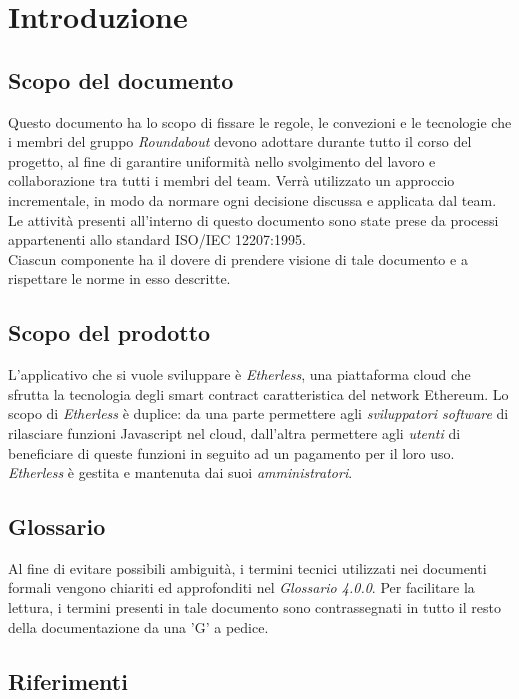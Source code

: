 \section{Introduzione}

\subsection{Scopo del documento}
Questo documento ha lo scopo di fissare le regole, le convezioni e le tecnologie che i membri del gruppo \textit{Roundabout} devono adottare durante tutto il corso del progetto, al fine di garantire uniformità nello svolgimento del lavoro e collaborazione tra tutti i membri del team. 
Verrà utilizzato un approccio incrementale, in modo da normare ogni decisione discussa
e applicata dal team. Le attività presenti all'interno di questo documento sono state prese da processi appartenenti allo standard ISO/IEC 12207:1995. \\
Ciascun componente ha il dovere di prendere visione di tale documento e a rispettare le norme in esso descritte.

\subsection{Scopo del prodotto}
L'applicativo che si vuole sviluppare è \textit{Etherless}, una piattaforma cloud che sfrutta la tecnologia degli smart contract caratteristica del network Ethereum. Lo scopo di \textit{Etherless} è duplice: da una parte permettere agli \textit{sviluppatori software} di rilasciare funzioni Javascript nel cloud, dall'altra permettere agli \textit{utenti} di beneficiare di queste funzioni in seguito ad un pagamento per il loro uso. 
\textit{Etherless} è gestita e mantenuta dai suoi \textit{amministratori}.

\subsection{Glossario}
Al fine di evitare possibili ambiguità, i termini tecnici utilizzati nei documenti formali vengono chiariti ed approfonditi nel \textit{Glossario 4.0.0}. Per facilitare la lettura, i termini presenti in tale documento sono contrassegnati in tutto il resto della documentazione da una 'G' a pedice.

\subsection{Riferimenti}

